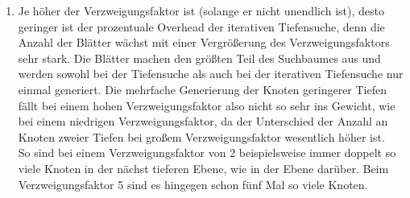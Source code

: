\documentclass[a4paper,10pt]{article}
\begin{document}
\begin{enumerate}[~~a)]
    \item
    Je höher der Verzweigungsfaktor ist (solange er nicht unendlich ist), desto geringer ist der prozentuale Overhead der iterativen Tiefensuche, denn die Anzahl der Blätter wächst mit einer Vergrößerung des Verzweigungsfaktors sehr stark. Die Blätter machen den größten Teil des Suchbaumes aus und werden sowohl bei der Tiefensuche als auch bei der iterativen Tiefensuche nur einmal generiert. Die mehrfache Generierung der Knoten geringerer Tiefen fällt bei einem hohen Verzweigungsfaktor also nicht so sehr ins Gewicht, wie bei einem niedrigen Verzweigungsfaktor, da der Unterschied der Anzahl an Knoten zweier Tiefen bei großem Verzweigungsfaktor wesentlich höher ist.\\
    So sind bei einem Verzweigungsfaktor von 2 beispielsweise immer doppelt so viele Knoten in der nächst tieferen Ebene, wie in der Ebene darüber. Beim Verzweigungsfaktor 5 sind es hingegen schon fünf Mal so viele Knoten.
\end{enumerate}
\end{document}

